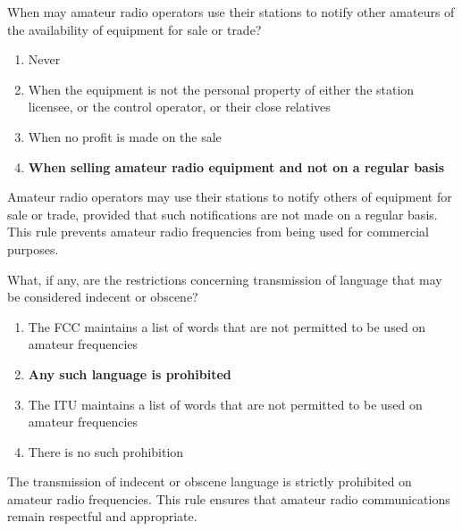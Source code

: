 \begin{tcolorbox}[colback=gray!10!white,colframe=black!75!black,title={T1D05}]
When may amateur radio operators use their stations to notify other amateurs of the availability of equipment for sale or trade?
\begin{enumerate}[label=\Alph*),noitemsep]
    \item Never
    \item When the equipment is not the personal property of either the station licensee, or the control operator, or their close relatives
    \item When no profit is made on the sale
    \item \textbf{When selling amateur radio equipment and not on a regular basis}
\end{enumerate}
\end{tcolorbox}
Amateur radio operators may use their stations to notify others of equipment for sale or trade, provided that such notifications are not made on a regular basis. This rule prevents amateur radio frequencies from being used for commercial purposes.


\begin{tcolorbox}[colback=gray!10!white,colframe=black!75!black,title={T1D06}]
What, if any, are the restrictions concerning transmission of language that may be considered indecent or obscene?
\begin{enumerate}[label=\Alph*),noitemsep]
    \item The FCC maintains a list of words that are not permitted to be used on amateur frequencies
    \item \textbf{Any such language is prohibited}
    \item The ITU maintains a list of words that are not permitted to be used on amateur frequencies
    \item There is no such prohibition
\end{enumerate}
\end{tcolorbox}
The transmission of indecent or obscene language is strictly prohibited on amateur radio frequencies. This rule ensures that amateur radio communications remain respectful and appropriate.


